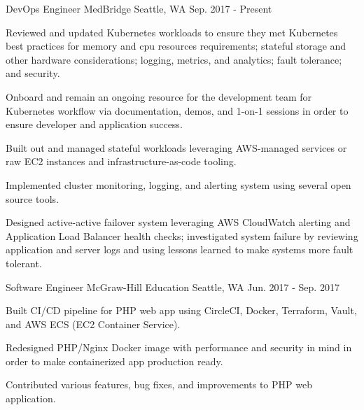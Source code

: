 


\begin{cventries}


\cventry
{DevOps Engineer} %
{MedBridge} %
{Seattle, WA} %
{Sep. 2017 - Present} %
{ %
\begin{cvitems}
\item {Reviewed and updated Kubernetes workloads to ensure they met Kubernetes best practices for memory and cpu resources requirements; stateful storage and other hardware considerations; logging, metrics, and analytics; fault tolerance; and security.}
\item {Onboard and remain an ongoing resource for the development team for Kubernetes workflow via documentation, demos, and 1-on-1 sessions in order to ensure developer and application success.}
\item {Built out and managed stateful workloads leveraging AWS-managed services or raw EC2 instances and infrastructure-as-code tooling.}
\item {Implemented cluster monitoring, logging, and alerting system using several open source tools.} 
\item {Designed active-active failover system leveraging AWS CloudWatch alerting and Application Load Balancer health checks; investigated system failure by reviewing application and server logs and using lessons learned to make systems more fault tolerant.}
\end{cvitems}
}


\cventry
{Software Engineer} %
{McGraw-Hill Education} %
{Seattle, WA} %
{Jun. 2017 - Sep. 2017} %
{ %
\begin{cvitems}
\item {Built CI/CD pipeline for PHP web app using CircleCI, Docker, Terraform, Vault, and AWS ECS (EC2 Container Service).}
\item {Redesigned PHP/Nginx Docker image with performance and security in mind in order to make containerized app production ready.}
\item {Contributed various features, bug fixes, and improvements to PHP web application.}
\end{cvitems}
}


\end{cventries}
